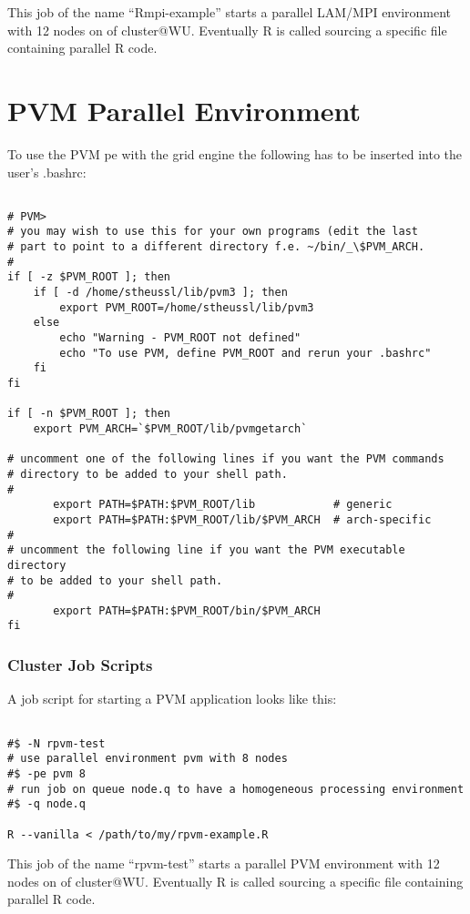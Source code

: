 This job of the name ``Rmpi-example'' starts a parallel LAM/MPI environment
with 12 nodes on  of cluster@WU. Eventually R is
called sourcing a specific file containing parallel R code.

\section{PVM Parallel Environment}

To use the PVM pe with the grid engine the following has to be
inserted into the user's .bashrc:

\begin{verbatim}

# PVM>
# you may wish to use this for your own programs (edit the last
# part to point to a different directory f.e. ~/bin/_\$PVM_ARCH.
#
if [ -z $PVM_ROOT ]; then
    if [ -d /home/stheussl/lib/pvm3 ]; then
        export PVM_ROOT=/home/stheussl/lib/pvm3
    else
        echo "Warning - PVM_ROOT not defined"
        echo "To use PVM, define PVM_ROOT and rerun your .bashrc"
    fi
fi

if [ -n $PVM_ROOT ]; then
    export PVM_ARCH=`$PVM_ROOT/lib/pvmgetarch`

# uncomment one of the following lines if you want the PVM commands
# directory to be added to your shell path.
#
       export PATH=$PATH:$PVM_ROOT/lib            # generic
       export PATH=$PATH:$PVM_ROOT/lib/$PVM_ARCH  # arch-specific
#
# uncomment the following line if you want the PVM executable directory
# to be added to your shell path.
#
       export PATH=$PATH:$PVM_ROOT/bin/$PVM_ARCH
fi

\end{verbatim}


\subsubsection{Cluster Job Scripts}

A job script for starting a PVM application looks like this:

\begin{verbatim}

#$ -N rpvm-test
# use parallel environment pvm with 8 nodes
#$ -pe pvm 8 
# run job on queue node.q to have a homogeneous processing environment 
#$ -q node.q

R --vanilla < /path/to/my/rpvm-example.R

\end{verbatim}

This job of the name ``rpvm-test'' starts a parallel PVM environment 
with 12 nodes on  of cluster@WU. Eventually R is
called sourcing a specific file containing parallel R code.
